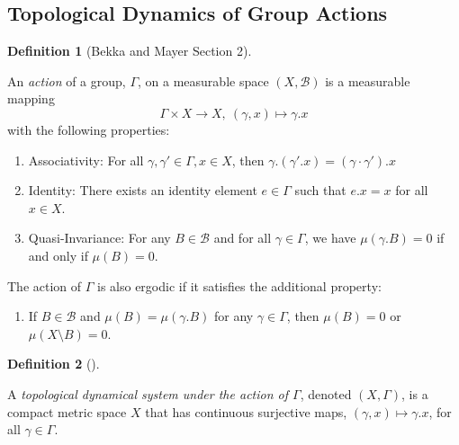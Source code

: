 \documentclass[
  british,
]{article}
\providecommand{\tightlist}{%
  \setlength{\itemsep}{0pt}\setlength{\parskip}{0pt}}
\theoremstyle{definition}
\newtheorem{definition}{Definition}[section]
\theoremstyle{plain}
\theoremstyle{plain}
\theoremstyle{remark}
\newcommand{\GroupIdentity}{{e}}
\newcommand{\Measure}{{\mu}}
\newcommand{\GroupElement}{{\gamma}}
\newcommand{\GroupAction}[2]{{#1}.{#2}}
\newcommand{\Group}{{\Gamma}}
\newcommand{\SigmaAlgebra}[1]{{\mathscr{#1}}}
\newcommand{\GroupOperation}[2]{{#1}\cdot{#2}}
\begin{document}
\subsection{Topological Dynamics of Group
Actions}\label{topological-dynamics-of-group-actions}

\begin{definition}[Bekka and Mayer
 Section
2]\protect\hypertarget{def-ActionDef}{}\label{def-ActionDef}

An \emph{action} of a group, \(\Group\), on a measurable space
\((X,\SigmaAlgebra{B})\) is a measurable mapping
\[\Group\times X\rightarrow X,\ (\GroupElement,x)\mapsto \GroupAction{\GroupElement}{x} \]
with the following properties:

\begin{enumerate}
\def\labelenumi{\arabic{enumi}.}
\tightlist
\item
  Associativity: For all
  \(\GroupElement,\GroupElement'\in \Group,x\in X\), then
  \(\GroupAction{\GroupElement}{(\GroupAction{\GroupElement'}{x})}=\GroupAction{(\GroupOperation{\GroupElement}{\GroupElement'})}{x}\)
\item
  Identity: There exists an identity element \(\GroupIdentity\in\Group\)
  such that \(\GroupAction{\GroupIdentity}{x}=x\) for all \(x\in X\).
\item
  Quasi-Invariance: For any \(B\in\SigmaAlgebra{B}\) and for all
  \(\GroupElement\in\Group\), we have
  \(\Measure(\GroupAction{\GroupElement}{B})=0\) if and only if
  \(\Measure(B)=0\).
\end{enumerate}

The action of \(\Group\) is also ergodic if it satisfies the additional
property:

\begin{enumerate}
\def\labelenumi{\arabic{enumi}.}
\setcounter{enumi}{3}
\tightlist
\item
  If \(B\in\SigmaAlgebra{B}\) and
  \(\Measure(B)=\Measure(\GroupAction{\GroupElement}{B})\) for any
  \(\GroupElement\in\Group\), then \(\Measure(B)=0\) or
  \(\Measure(X\setminus B)=0\).
\end{enumerate}

\end{definition}

\begin{definition}[]\protect\hypertarget{def-TopologicalDynamicSystemsDef}{}\label{def-TopologicalDynamicSystemsDef}

A \emph{topological dynamical system under the action of \(\Group\)},
denoted \((X,\Group)\), is a compact metric space \(X\) that has
continuous surjective maps,
\((\GroupElement,x)\mapsto \GroupAction{\GroupElement}{x}\), for all
\(\GroupElement\in\Group\).

\end{definition}
\end{document}
